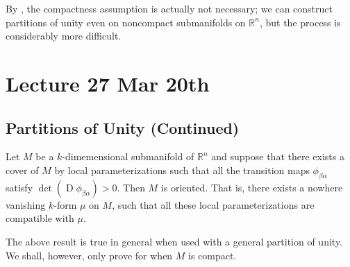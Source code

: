 \documentclass[notoc,notitlepage]{tufte-book}
\DeclareMathOperator{\D}{D}
\begin{document}
\begin{remark}
  By \citet{karigiannis2019}, the compactness assumption is actually not
  necessary; we can construct partitions of unity even on noncompact
  submanifolds on $\mathbb{R}^n$, but the process is considerably more
  difficult.
\end{remark}



\chapter{Lecture 27 Mar 20th}%
\label{chp:lecture_27_mar_20th}

\section{Partitions of Unity (Continued)}%
\label{sec:partitions_of_unity_continued}

\begin{propo}\label{propo:compatible_local_parameterizations_implies_orientability}
  Let $M$ be a $k$-dimemensional submanifold of $\mathbb{R}^n$ and suppose that
  there exists a cover of $M$ by local parameterizations such that all the
  transition maps $\phi_{\beta \alpha}$ satisfy $\det (\D \phi_{ \beta \alpha }) >
  0$. Then $M$ is oriented. That is, there exists a nowhere vanishing $k$-form
  $\mu$ on $M$, such that all these local parameterizations are compatible with
  $\mu$.
\end{propo}

\begin{note}
  The above result is true in general when used with a general partition of
  unity. We shall, however, only prove for when $M$ is compact.
\end{note}
\end{document}
